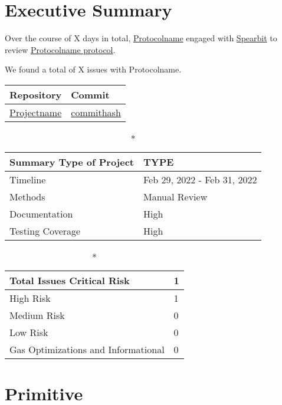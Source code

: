 \documentclass[14pt]{extarticle}
\begin{document}
\hypertarget{executive-summary}{%
\section{Executive Summary}\label{executive-summary}}

Over the course of X days in total, \href{https://protocolname.come}{Protocolname} engaged with
\href{https://spearbit.com}{Spearbit} to review
\href{https://github.com/permalink-to-protocolname}{Protocolname protocol}. 

We found a total of X issues with Protocolname. 

\begin{longtable}[c]{|l|l|}
\hline \textbf{Repository} & \textbf{Commit} \\

\hline
\href{https://github.com/permalink}{Projectname} &
\href{https://github.com/permalink/commit/commithash}{commithash} \\
\hline
\end{longtable}

\begin{longtable}[]{|l|l|}

\caption*{\textbf{Summary}}
\hline Type of Project & TYPE \\   
\hline Timeline & Feb 29, 2022 - Feb 31, 2022   \\
\hline Methods & Manual Review \\
\hline Documentation & High \\
\hline Testing Coverage & High  \\
\hline
\end{longtable}


\begin{longtable}[]{|l|l|}
\caption*{\textbf{Total Issues}}
\hline Critical Risk & 1 \\
\hline High Risk & 1 \\
\hline Medium Risk & 0 \\ 
\hline Low Risk & 0 \\
\hline Gas Optimizations and Informational & 0 \\
\hline
\end{longtable}

\tableofcontents

\section{Primitive}\label{primitive}
\end{document}
